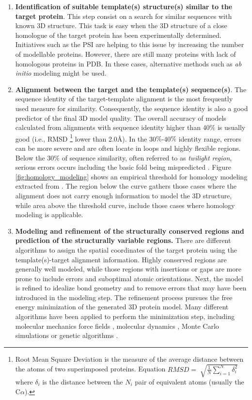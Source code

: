\documentclass[11pt, b5paper,twoside]{tesi_upf}
\begin{document}
\begin{enumerate}
\item \textbf{Identification of suitable template(s) structure(s) similar to the target protein}. This step consist on a search for similar sequences with known 3D structure. This task is easy when the 3D structure of a close homologue of the target protein has been experimentally determined. Initiatives such as the PSI \cite{Norvell2007} are helping to this issue by increasing the number of modellable proteins. However, there are still many proteins with lack of homologous proteins in PDB. In these cases, alternative methods such as \textit{ab initio} modeling might be used.  

\item \textbf{Alignment between the target and the template(s) sequence(s)}. The sequence identity of the target-template alignment is the most frequently used measure for similarity. Consequently, the sequence identity is also a good predictor of the final 3D model quality. The overall accuracy of models calculated from alignments with sequence identity higher than 40$\%$ is usually good (i.e., RMSD \footnote{Root Mean Square Deviation is the measure of the average distance between the atoms of two superimposed proteins. Equation $RMSD=\sqrt[]{\frac{1}{N} \sum\limits_{i=1}^N \delta_i^2}$ where $\delta_i$ is the distance between the $N_i$ pair of equivalent atoms (usually the C$\alpha$).}  lower than 2.0\AA). In the 30$\%$-40$\%$ identity range, errors can be more severe and are often locate in loops and highly flexible regions. Below the 30$\%$ of sequence similarity, often referred to as \textit{twilight region}, serious errors occurs including the basic fold being mispredicted \cite{Baker2001, twilight1996}.
Figure \ref{fig:homology_modeling} shows an empirical threshold for homology modeling extracted from \cite{Sander1991}. The region below the curve gathers those cases where the alignment does not carry enough information to model the 3D structure, while area above the threshold curve, include those cases where homology modeling is applicable.  
\item \textbf{Modeling and refinement of the structurally conserved regions and prediction of the structurally variable regions.} There are different algorithms to assign the spatial coordinates of the target protein using the template(s)-target alignment information. Highly conserved regions are generally well modeled, while those regions with insertions or gaps are more prone to include errors and suboptimal atomic orientations. Next, the model is refined to idealize bond geometry and to remove errors that may have been introduced in the modeling step. The refinement process pursues the free energy minimization of the generated 3D protein model. Many different algorithms have been applied to perform the minimization step, including molecular mechanics force fields \cite{PRO1410}, molecular dynamics \cite{Fiser2000}, Monte Carlo simulations  \cite{Kidera1995} or genetic algorithms \cite{McGarrah1993}.
 

\end{enumerate}
\end{document}
